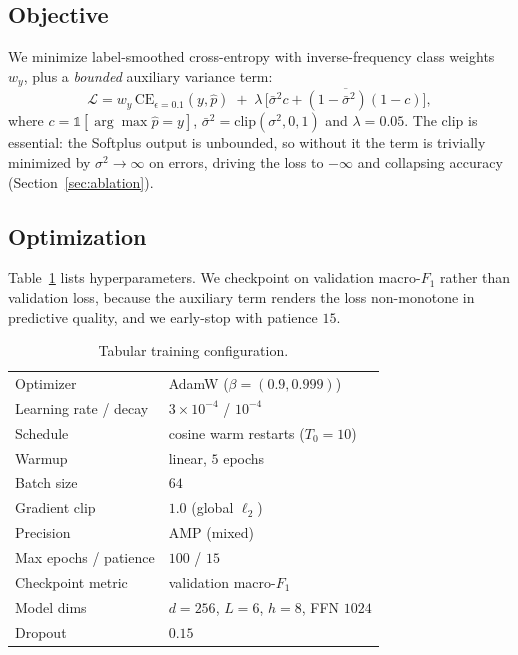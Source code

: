 \documentclass[10pt,twocolumn]{article}
\begin{document}
\subsection{Objective}
We minimize label-smoothed cross-entropy with inverse-frequency class weights
$w_y$, plus a \emph{bounded} auxiliary variance term:
\begin{equation}
\mathcal{L} = w_y\,\mathrm{CE}_{\epsilon=0.1}(y,\hat{p})
\;+\;\lambda\,\overline{\big[\bar\sigma^2 c + (1-\bar\sigma^2)(1-c)\big]},
\end{equation}
where $c=\mathbb{1}[\arg\max\hat{p}=y]$, $\bar\sigma^2=\mathrm{clip}(\sigma^2,0,1)$
and $\lambda{=}0.05$. The clip is essential: the Softplus output is unbounded, so
without it the term is trivially minimized by $\sigma^2\!\to\!\infty$ on errors,
driving the loss to $-\infty$ and collapsing accuracy (Section~\ref{sec:ablation}).

\subsection{Optimization}
Table~\ref{tab:hparams} lists hyperparameters. We checkpoint on validation
macro-$F_1$ rather than validation loss, because the auxiliary term renders the loss
non-monotone in predictive quality, and we early-stop with patience $15$.

\begin{table}[t]
\centering
\caption{Tabular training configuration.}
\label{tab:hparams}
\small
\begin{tabular}{ll}
\toprule
Optimizer & AdamW ($\beta{=}(0.9,0.999)$) \\
Learning rate / decay & $3\times10^{-4}$ / $10^{-4}$ \\
Schedule & cosine warm restarts ($T_0{=}10$) \\
Warmup & linear, $5$ epochs \\
Batch size & $64$ \\
Gradient clip & $1.0$ (global $\ell_2$) \\
Precision & AMP (mixed) \\
Max epochs / patience & $100$ / $15$ \\
Checkpoint metric & validation macro-$F_1$ \\
Model dims & $d{=}256$, $L{=}6$, $h{=}8$, FFN $1024$ \\
Dropout & $0.15$ \\
\bottomrule
\end{tabular}
\end{table}
\end{document}
